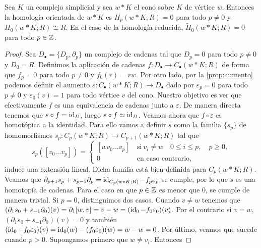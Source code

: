 \begin{proposicion}
	\label{prop:char-homol-cono} Sea \(K\) un complejo simplicial y sea \(w \ast K\) el
	cono sobre \(K\) de vértice \(w\). Entonces la homología orientada de \(w \ast K\)
	es \(H_{p}(w \ast K;R) = 0\) para todo \(p \neq 0\) y \(H_{0}(w \ast K;R) \cong R\).
	En el caso de la homología reducida, \(\widetilde{H}_{0}(w \ast K;R) = 0\) para
	todo \(p \in \mathbb{Z}\).
\end{proposicion}
\begin{proof}
	Sea \(D_{\bullet}= \{D_{p}, \partial_{p}\}\) un complejo de cadenas tal que \(D_{p}
	= 0\) para todo \(p \neq 0\) y \(D_{0}= R\). Definimos la aplicación de cadenas
	\(f: D_{\bullet}\to C_{\bullet}(w \ast K;R)\) de forma que \(f_{p}= 0\) para todo
	\(p \neq 0\) y \(f_{0}(r)=rw\). Por otro lado, por la \autoref{prop:aumento}
	podemos definir el aumento
	\(\varepsilon: C_{\bullet}(w \ast K;R) \to D_{\bullet}\) dado por
	\(\varepsilon_{p}=0\) para todo \(p \neq 0\) y \(\varepsilon_{0}(v) = 1\) para todo
	vértice \(v\) del cono. Nuestro objetivo es ver que efectivamente \(f\) es una equivalencia
	de cadenas junto a \(\varepsilon\). De manera directa tenemos que
	\(\varepsilon \circ f = \operatorname{id}_{D}\), luego \(\varepsilon \circ f \simeq \operatorname{id}_{D}\).
	Veamos ahora que \(f \circ \varepsilon\) es homotópica a la identidad. Para ello
	vamos a definir \(s\) como la familia \(\{s_{p}\}\) de homomorfismos \(s_{p}: C_{p}(
	w \ast K;R) \to C_{p+1}(w \ast K;R)\) tal que
	\[
	s_{p}([v_{0}\ldots v_{p}]) =
	\begin{cases}
		[wv_{0}\ldots v_{p}] \  & \text{si}\ v_{i}\neq w \quad 0 \leq i \leq p,\quad p \geq 0, \\
		0 \                     & \text{en caso contrario},
	\end{cases}
	\]
	induce una extensión lineal. Dicha familia está bien definida para
	\(C_{p}(w \ast K;R)\). Veamos que \(\partial_{p+1}s_{p}+ s_{p-1}\partial_{p}= \operatorname{id}_{C_p(w
		\ast K;R)}- f_{p}\varepsilon_{p}\) se cumple, por lo que \(s\) es una homotopía
	de cadenas. Para el caso en que \(p \in \mathbb{Z}\) es menor que \(0\), se cumple de manera
	trivial. Si \(p = 0\), distinguimos dos casos. Cuando \(v \neq w\) tenemos que \((\partial
	_{1}s_{0}+s_{-1}\partial_{0})(v) = \partial_{1}[w,v] = v-w = (\operatorname{id}_{0}- f_{0}\varepsilon
	_{0})(v)\). Por el contrario si \(v = w\), \((\partial_{1}s_{0}+s_{-1}\partial_{0})
	(v) = 0\) y también \((\operatorname{id}_{0}- f_{0}\varepsilon_{0})(v) = \operatorname{id}_{0}(w) - (f_{0}\varepsilon
	_{0})(w) = w - w = 0\). Por último, veamos que sucede cuando \(p > 0\).
	Supongamos primero que \(w \neq v_{i}\). Entonces

\end{proof}

